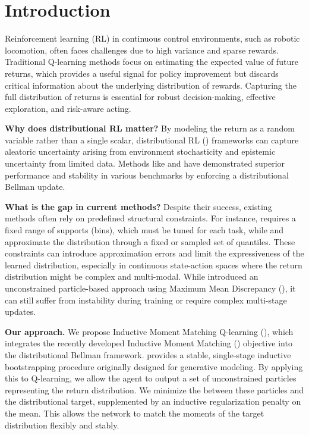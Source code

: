 \section{Introduction}

Reinforcement learning (RL) in continuous control environments, such as robotic locomotion, often faces challenges due to high variance and sparse rewards. Traditional Q-learning methods focus on estimating the expected value of future returns, which provides a useful signal for policy improvement but discards critical information about the underlying distribution of rewards. Capturing the full distribution of returns is essential for robust decision-making, effective exploration, and risk-aware acting.

{\bf Why does distributional RL matter?} By modeling the return as a random variable rather than a single scalar, distributional RL (\distrl) frameworks can capture aleatoric uncertainty arising from environment stochasticity and epistemic uncertainty from limited data. Methods like \cfiftyone \cite{bellemare2017distributional} and \qrdqn \cite{dabney2018distributional} have demonstrated superior performance and stability in various benchmarks by enforcing a distributional Bellman update.

{\bf What is the gap in current methods?} Despite their success, existing \distrl methods often rely on predefined structural constraints. For instance, \cfiftyone requires a fixed range of supports (bins), which must be tuned for each task, while \qrdqn and \iqn \cite{dabney2018implicit} approximate the distribution through a fixed or sampled set of quantiles. These constraints can introduce approximation errors and limit the expressiveness of the learned distribution, especially in continuous state-action spaces where the return distribution might be complex and multi-modal. While \mmddqn \cite{nguyen2020distributional} introduced an unconstrained particle-based approach using Maximum Mean Discrepancy (\mmd), it can still suffer from instability during training or require complex multi-stage updates.

{\bf Our approach.} We propose Inductive Moment Matching Q-learning (\immq), which integrates the recently developed Inductive Moment Matching (\imm) objective \cite{zhou2025inductive} into the distributional Bellman framework. \imm provides a stable, single-stage inductive bootstrapping procedure originally designed for generative modeling. By applying this to Q-learning, we allow the agent to output a set of unconstrained particles representing the return distribution. We minimize the \mmd between these particles and the distributional target, supplemented by an inductive regularization penalty on the mean. This allows the network to match the moments of the target distribution flexibly and stably.


